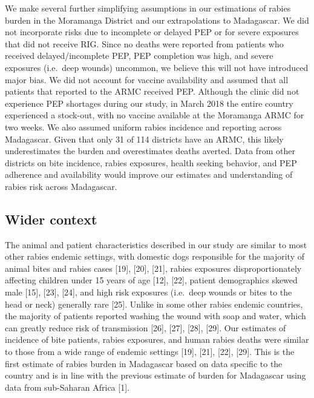 \documentclass[
  oneside]{book}
\begin{document}
We make several further simplifying assumptions in our estimations of rabies burden in the Moramanga District and our extrapolations to Madagascar. We did not incorporate risks due to incomplete or delayed PEP or for severe exposures that did not receive RIG. Since no deaths were reported from patients who received delayed/incomplete PEP, PEP completion was high, and severe exposures (i.e.~deep wounds) uncommon, we believe this will not have introduced major bias. We did not account for vaccine availability and assumed that all patients that reported to the ARMC received PEP. Although the clinic did not experience PEP shortages during our study, in March 2018 the entire country experienced a stock-out, with no vaccine available at the Moramanga ARMC for two weeks. We also assumed uniform rabies incidence and reporting across Madagascar. Given that only 31 of 114 districts have an ARMC, this likely underestimates the burden and overestimates deaths averted. Data from other districts on bite incidence, rabies exposures, health seeking behavior, and PEP adherence and availability would improve our estimates and understanding of rabies risk across Madagascar.

\hypertarget{wider-context}{%
\subsection{Wider context}\label{wider-context}}

The animal and patient characteristics described in our study are similar to most other rabies endemic settings, with domestic dogs responsible for the majority of animal bites and rabies cases {[}19{]}, {[}20{]}, {[}21{]}, rabies exposures disproportionately affecting children under 15 years of age {[}12{]}, {[}22{]}, patient demographics skewed male {[}15{]}, {[}23{]}, {[}24{]}, and high risk exposures (i.e.~deep wounds or bites to the head or neck) generally rare {[}25{]}. Unlike in some other rabies endemic countries, the majority of patients reported washing the wound with soap and water, which can greatly reduce risk of transmission {[}26{]}, {[}27{]}, {[}28{]}, {[}29{]}. Our estimates of incidence of bite patients, rabies exposures, and human rabies deaths were similar to those from a wide range of endemic settings {[}19{]}, {[}21{]}, {[}22{]}, {[}29{]}. This is the first estimate of rabies burden in Madagascar based on data specific to the country and is in line with the previous estimate of burden for Madagascar using data from sub-Saharan Africa {[}1{]}.
\end{document}
